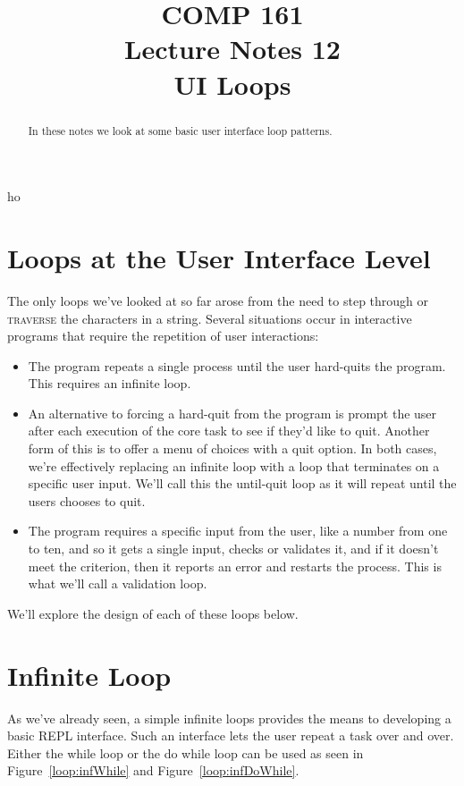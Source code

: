 ho\documentclass[]{tufte-handout}
\title{COMP 161 \\ Lecture Notes 12 \\ UI Loops}
\begin{document}
\maketitle

\begin{abstract}
In these notes we look at some basic user interface loop patterns.
\end{abstract}

\section{Loops at the User Interface Level}

The only loops we've looked at so far arose from the need to step through or \textsc{traverse} the characters in a string.  Several situations occur in interactive programs that require the repetition of user interactions:
\begin{itemize}
	\item The program repeats a single process until the user hard-quits the program.  This requires an infinite loop.
	\item An alternative to forcing a hard-quit from the program is prompt the user after each execution of the core task to see if they'd like to quit. Another form of this is to offer a menu of choices with a quit option. In both cases, we're effectively replacing an infinite loop with a loop that terminates on a specific user input. We'll call this the until-quit loop as it will repeat until the users chooses to quit.
	\item The program requires a specific input from the user, like a number from one to ten, and so it gets a single input, checks or validates it, and if it doesn't meet the criterion, then it reports an error and restarts the process. This is what we'll call a validation loop.
\end{itemize}

We'll explore the design of each of these loops below.

\section{Infinite Loop}

As we've already seen, a simple infinite loops provides the means to developing a basic REPL interface. Such an interface lets the user repeat a task over and over.  Either the while loop or the do while loop can be used as seen in Figure~\ref{loop:infWhile} and Figure~\ref{loop:infDoWhile}.
\end{document}
